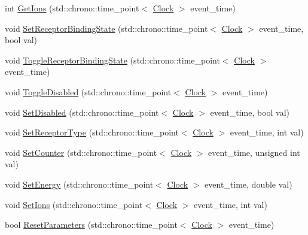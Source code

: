 \begin{DoxyCompactItemize}
\item 
int \mbox{\hyperlink{classNeuroreceptor_a69103180d9b335b9504b4ae3c203d0ea}{Get\+Ions}} (std\+::chrono\+::time\+\_\+point$<$ \mbox{\hyperlink{universe_8h_a0ef8d951d1ca5ab3cfaf7ab4c7a6fd80}{Clock}} $>$ event\+\_\+time)
\item 
void \mbox{\hyperlink{classNeuroreceptor_a75adddd7e615af57b8f3f841ec25463c}{Set\+Receptor\+Binding\+State}} (std\+::chrono\+::time\+\_\+point$<$ \mbox{\hyperlink{universe_8h_a0ef8d951d1ca5ab3cfaf7ab4c7a6fd80}{Clock}} $>$ event\+\_\+time, bool val)
\item 
void \mbox{\hyperlink{classNeuroreceptor_ace41227d30a8f50e1a6efadc86573f80}{Toggle\+Receptor\+Binding\+State}} (std\+::chrono\+::time\+\_\+point$<$ \mbox{\hyperlink{universe_8h_a0ef8d951d1ca5ab3cfaf7ab4c7a6fd80}{Clock}} $>$ event\+\_\+time)
\item 
void \mbox{\hyperlink{classNeuroreceptor_a8a339a4d0f150bbdfbc2650155625196}{Toggle\+Disabled}} (std\+::chrono\+::time\+\_\+point$<$ \mbox{\hyperlink{universe_8h_a0ef8d951d1ca5ab3cfaf7ab4c7a6fd80}{Clock}} $>$ event\+\_\+time)
\item 
void \mbox{\hyperlink{classNeuroreceptor_aeec8bb2442e04700d4e9d80bb2d6e47e}{Set\+Disabled}} (std\+::chrono\+::time\+\_\+point$<$ \mbox{\hyperlink{universe_8h_a0ef8d951d1ca5ab3cfaf7ab4c7a6fd80}{Clock}} $>$ event\+\_\+time, bool val)
\item 
void \mbox{\hyperlink{classNeuroreceptor_a0e6e88d6c5b357872f055edbddb54d4c}{Set\+Receptor\+Type}} (std\+::chrono\+::time\+\_\+point$<$ \mbox{\hyperlink{universe_8h_a0ef8d951d1ca5ab3cfaf7ab4c7a6fd80}{Clock}} $>$ event\+\_\+time, int val)
\item 
void \mbox{\hyperlink{classNeuroreceptor_a0660a316ef44cf723509f720acd16f24}{Set\+Counter}} (std\+::chrono\+::time\+\_\+point$<$ \mbox{\hyperlink{universe_8h_a0ef8d951d1ca5ab3cfaf7ab4c7a6fd80}{Clock}} $>$ event\+\_\+time, unsigned int val)
\item 
void \mbox{\hyperlink{classNeuroreceptor_ac1189f9c40e3cd07e4b1dc11115ad882}{Set\+Energy}} (std\+::chrono\+::time\+\_\+point$<$ \mbox{\hyperlink{universe_8h_a0ef8d951d1ca5ab3cfaf7ab4c7a6fd80}{Clock}} $>$ event\+\_\+time, double val)
\item 
void \mbox{\hyperlink{classNeuroreceptor_a36a548475e752631130a2b4ec67c66b6}{Set\+Ions}} (std\+::chrono\+::time\+\_\+point$<$ \mbox{\hyperlink{universe_8h_a0ef8d951d1ca5ab3cfaf7ab4c7a6fd80}{Clock}} $>$ event\+\_\+time, int val)
\item 
bool \mbox{\hyperlink{classNeuroreceptor_a30debeb0311d92eb6abe354409c15d09}{Reset\+Parameters}} (std\+::chrono\+::time\+\_\+point$<$ \mbox{\hyperlink{universe_8h_a0ef8d951d1ca5ab3cfaf7ab4c7a6fd80}{Clock}} $>$ event\+\_\+time)

\end{DoxyCompactItemize}
